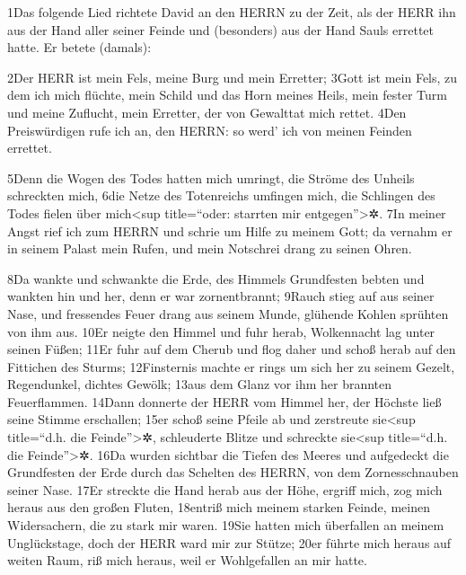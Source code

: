 1Das folgende Lied richtete David an den HERRN zu der Zeit, als der HERR
ihn aus der Hand aller seiner Feinde und (besonders) aus der Hand Sauls
errettet hatte. Er betete (damals):

2Der HERR ist mein Fels, meine Burg und mein Erretter; 3Gott ist mein
Fels, zu dem ich mich flüchte, mein Schild und das Horn meines Heils,
mein fester Turm und meine Zuflucht, mein Erretter, der von Gewalttat
mich rettet. 4Den Preiswürdigen rufe ich an, den HERRN: so werd' ich von
meinen Feinden errettet.

5Denn die Wogen des Todes hatten mich umringt, die Ströme des Unheils
schreckten mich, 6die Netze des Totenreichs umfingen mich, die Schlingen
des Todes fielen über mich\textless sup title=``oder: starrten mir
entgegen''\textgreater✲. 7In meiner Angst rief ich zum HERRN und schrie
um Hilfe zu meinem Gott; da vernahm er in seinem Palast mein Rufen, und
mein Notschrei drang zu seinen Ohren.

8Da wankte und schwankte die Erde, des Himmels Grundfesten bebten und
wankten hin und her, denn er war zornentbrannt; 9Rauch stieg auf aus
seiner Nase, und fressendes Feuer drang aus seinem Munde, glühende
Kohlen sprühten von ihm aus. 10Er neigte den Himmel und fuhr herab,
Wolkennacht lag unter seinen Füßen; 11Er fuhr auf dem Cherub und flog
daher und schoß herab auf den Fittichen des Sturms; 12Finsternis machte
er rings um sich her zu seinem Gezelt, Regendunkel, dichtes Gewölk;
13aus dem Glanz vor ihm her brannten Feuerflammen. 14Dann donnerte der
HERR vom Himmel her, der Höchste ließ seine Stimme erschallen; 15er
schoß seine Pfeile ab und zerstreute sie\textless sup title=``d.h. die
Feinde''\textgreater✲, schleuderte Blitze und schreckte sie\textless sup
title=``d.h. die Feinde''\textgreater✲. 16Da wurden sichtbar die Tiefen
des Meeres und aufgedeckt die Grundfesten der Erde durch das Schelten
des HERRN, von dem Zornesschnauben seiner Nase. 17Er streckte die Hand
herab aus der Höhe, ergriff mich, zog mich heraus aus den großen Fluten,
18entriß mich meinem starken Feinde, meinen Widersachern, die zu stark
mir waren. 19Sie hatten mich überfallen an meinem Unglückstage, doch der
HERR ward mir zur Stütze; 20er führte mich heraus auf weiten Raum, riß
mich heraus, weil er Wohlgefallen an mir hatte.

